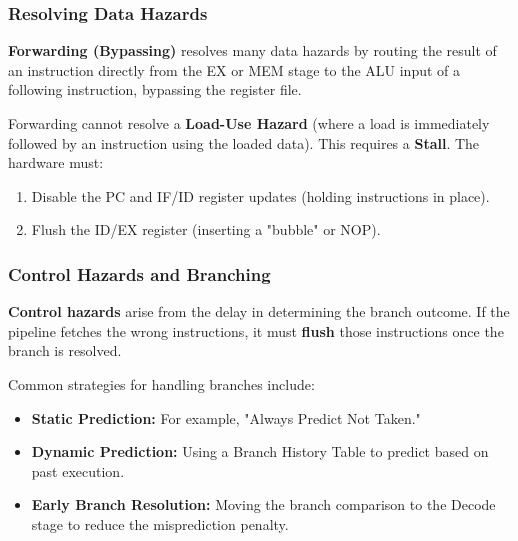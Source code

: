 \subsubsection{Resolving Data Hazards}

\begin{lemma}
	\textbf{Forwarding (Bypassing)} resolves many data hazards by routing the result of an instruction directly from the EX or MEM stage to the ALU input of a following instruction, bypassing the register file.
\end{lemma}

\begin{important}
	Forwarding cannot resolve a \textbf{Load-Use Hazard} (where a load is immediately followed by an instruction using the loaded data). This requires a \textbf{Stall}. The hardware must:
	\begin{enumerate}
		\item Disable the PC and IF/ID register updates (holding instructions in place).
		\item Flush the ID/EX register (inserting a "bubble" or NOP).
	\end{enumerate}
\end{important}

\subsubsection{Control Hazards and Branching}

\begin{definition}
	\textbf{Control hazards} arise from the delay in determining the branch outcome. If the pipeline fetches the wrong instructions, it must \textbf{flush} those instructions once the branch is resolved.
\end{definition}

\begin{remark}
	Common strategies for handling branches include:
	\begin{itemize}
		\item \textbf{Static Prediction:} For example, "Always Predict Not Taken."
		\item \textbf{Dynamic Prediction:} Using a Branch History Table to predict based on past execution.
		\item \textbf{Early Branch Resolution:} Moving the branch comparison to the Decode stage to reduce the misprediction penalty.
	\end{itemize}
\end{remark}

